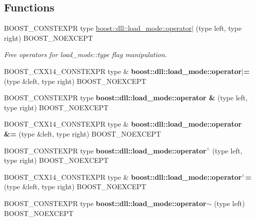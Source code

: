 \subsection*{Functions}
\begin{DoxyCompactItemize}
\item 
\mbox{\label{a00272_affd5b229588eb423b018e50119809564}} 
B\+O\+O\+S\+T\+\_\+\+C\+O\+N\+S\+T\+E\+X\+PR type \hyperlink{a00272_affd5b229588eb423b018e50119809564}{boost\+::dll\+::load\+\_\+mode\+::operator$\vert$} (type left, type right) B\+O\+O\+S\+T\+\_\+\+N\+O\+E\+X\+C\+E\+PT
\begin{DoxyCompactList}\small\item\em Free operators for load\+\_\+mode\+::type flag manipulation. \end{DoxyCompactList}\item 
\mbox{\label{a00272_a8a56194d67dabdf7edc67d3292ed80e9}} 
B\+O\+O\+S\+T\+\_\+\+C\+X\+X14\+\_\+\+C\+O\+N\+S\+T\+E\+X\+PR type \& {\bfseries boost\+::dll\+::load\+\_\+mode\+::operator$\vert$=} (type \&left, type right) B\+O\+O\+S\+T\+\_\+\+N\+O\+E\+X\+C\+E\+PT
\item 
\mbox{\label{a00272_adf95e65a7838c018a16827ac62e74bed}} 
B\+O\+O\+S\+T\+\_\+\+C\+O\+N\+S\+T\+E\+X\+PR type {\bfseries boost\+::dll\+::load\+\_\+mode\+::operator \&} (type left, type right) B\+O\+O\+S\+T\+\_\+\+N\+O\+E\+X\+C\+E\+PT
\item 
\mbox{\label{a00272_a52abc2ae37ed78808d3bb86bcfbca00f}} 
B\+O\+O\+S\+T\+\_\+\+C\+X\+X14\+\_\+\+C\+O\+N\+S\+T\+E\+X\+PR type \& {\bfseries boost\+::dll\+::load\+\_\+mode\+::operator \&=} (type \&left, type right) B\+O\+O\+S\+T\+\_\+\+N\+O\+E\+X\+C\+E\+PT
\item 
\mbox{\label{a00272_a1562aeea90b163e98ee50ad849df2397}} 
B\+O\+O\+S\+T\+\_\+\+C\+O\+N\+S\+T\+E\+X\+PR type {\bfseries boost\+::dll\+::load\+\_\+mode\+::operator$^\wedge$} (type left, type right) B\+O\+O\+S\+T\+\_\+\+N\+O\+E\+X\+C\+E\+PT
\item 
\mbox{\label{a00272_a3da32e46729782111a72e2e3aa7490fb}} 
B\+O\+O\+S\+T\+\_\+\+C\+X\+X14\+\_\+\+C\+O\+N\+S\+T\+E\+X\+PR type \& {\bfseries boost\+::dll\+::load\+\_\+mode\+::operator$^\wedge$=} (type \&left, type right) B\+O\+O\+S\+T\+\_\+\+N\+O\+E\+X\+C\+E\+PT
\item 
\mbox{\label{a00272_a081f141841a6896b40cf39d233118922}} 
B\+O\+O\+S\+T\+\_\+\+C\+O\+N\+S\+T\+E\+X\+PR type {\bfseries boost\+::dll\+::load\+\_\+mode\+::operator$\sim$} (type left) B\+O\+O\+S\+T\+\_\+\+N\+O\+E\+X\+C\+E\+PT
\end{DoxyCompactItemize}


